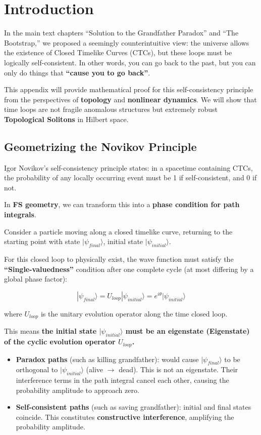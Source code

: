 \section{Introduction}

In the main text chapters ``Solution to the Grandfather Paradox'' and ``The Bootstrap,'' we proposed a seemingly counterintuitive view: the universe allows the existence of Closed Timelike Curves (CTCs), but these loops must be logically self-consistent. In other words, you can go back to the past, but you can only do things that \textbf{``cause you to go back''}.

This appendix will provide mathematical proof for this self-consistency principle from the perspectives of \textbf{topology} and \textbf{nonlinear dynamics}. We will show that time loops are not fragile anomalous structures but extremely robust \textbf{Topological Solitons} in Hilbert space.

\subsection{Geometrizing the Novikov Principle}

Igor Novikov's self-consistency principle states: in a spacetime containing CTCs, the probability of any locally occurring event must be 1 if self-consistent, and 0 if not.

In \textbf{FS geometry}, we can transform this into a \textbf{phase condition for path integrals}.

Consider a particle moving along a closed timelike curve, returning to the starting point with state $|\psi_{final}\rangle$, initial state $|\psi_{initial}\rangle$.

For this closed loop to physically exist, the wave function must satisfy the \textbf{``Single-valuedness''} condition after one complete cycle (at most differing by a global phase factor):

\[|\psi_{final}\rangle = U_{loop} |\psi_{initial}\rangle = e^{i\theta} |\psi_{initial}\rangle\]

where $U_{loop}$ is the unitary evolution operator along the time closed loop.

This means \textbf{the initial state $|\psi_{initial}\rangle$ must be an eigenstate (Eigenstate) of the cyclic evolution operator $U_{loop}$.}

\begin{itemize}
\item \textbf{Paradox paths} (such as killing grandfather): would cause $|\psi_{final}\rangle$ to be orthogonal to $|\psi_{initial}\rangle$ (alive $\to$ dead). This is not an eigenstate. Their interference terms in the path integral cancel each other, causing the probability amplitude to approach zero.

\item \textbf{Self-consistent paths} (such as saving grandfather): initial and final states coincide. This constitutes \textbf{constructive interference}, amplifying the probability amplitude.
\end{itemize}

